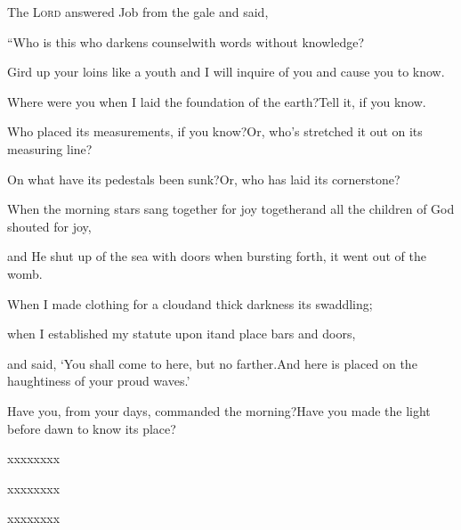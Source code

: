 
\begin{inparaenum}
  \pa {} The \textsc{Lord} answered Job from the gale and said,%
  
  \pb {} ``Who is this who darkens counsel\pa with words%
  without knowledge?%
  
  \pb {} Gird up your loins%
  like a youth%
  \pa and I will inquire of you and cause you to know.%
  
  \pb {} Where were you when I laid the foundation of the earth?\pa Tell it, if you know.%
  
  \pb {} Who placed its measurements, if you know?\pa Or, who's stretched it out on its measuring line?%
  
  \pb {} On what have its pedestals been sunk?\pa Or, who has laid its cornerstone?%
  
  \pb {} When the morning stars sang together for joy together\pa and all the children of God shouted for joy,%
  
  \pb {} and He shut up of the sea with doors%
  \pa when bursting forth, it went out of the womb.%
  
  \pb {} When I made clothing for a cloud\pa and thick darkness its swaddling;%
  
  \pb {} when I established my statute upon it\pa and place bars and doors,%
  
  \pb {} and said, `You shall come to here, but no farther.\pa And here is placed on the haughtiness of your proud waves.'%
  
  \pb {} Have you, from your days, commanded the morning?\pa Have you made the light before dawn to know its place?%
  
  \pb {} xxxx\pa xxxx%
  
  \pb {} xxxx\pa xxxx%
  
  \pb {} xxxx\pa xxxx%
  

\end{inparaenum}
